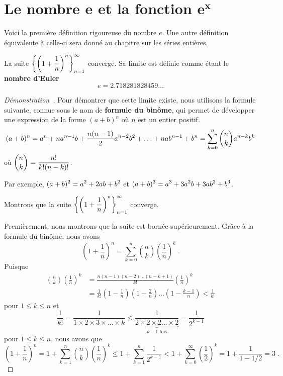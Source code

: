 {\section{Le nombre $\mathbf{e}$ et la fonction $\mathbf{e^x}$}\label{nbrE}


Voici la première définition rigoureuse du nombre $e$.  Une autre
définition équivalente à celle-ci sera donné au chapitre sur les
séries entières.

\begin{theorem}
La suite
$\displaystyle \left\{\left(1+\frac{1}{n}\right)^n\right\}_{n=1}^\infty$ 
converge.  Sa limite est définie comme étant le {\bfseries nombre
d'Euler}
\[
e=2.718281828459\ldots
\]
\label{limitDefe}
\end{theorem}

\begin{proof}[Démonstration\ \theory]
Pour démontrer que cette limite existe, nous utilisons la formule
suivante, connue sous le nom de
{\bfseries formule du binôme}, 
qui permet de développer une expression de la forme $(a+b)^n$ où $n$
est un entier positif.
\[
(a+b)^n = a^n + n a^{n-1}b + \frac{n(n-1)}{2}a^{n-2}b^2 + \ldots
+ n a b^{n-1} + b^n \\
= \sum_{k=0}^n \binom{n}{k} a^{n-k} b^k
\]
où $\displaystyle \binom{n}{k} = \frac{n!}{k!(n-k)!}$.

Par exemple, $\displaystyle (a+b)^2 = a^2 + 2ab + b^2$
et $\displaystyle (a+b)^3 = a^3 + 3a^2b + 3ab^2 + b^3$.

Montrons que la suite
$\displaystyle \left\{\left(1+\frac{1}{n}\right)^n\right\}_{n=1}^\infty$ 
converge.

Premièrement, nous montrons que la suite est bornée supérieurement.  Grâce
à la formule du binôme, nous avons
\[
\left( 1 + \frac{1}{n} \right)^n = \sum_{k=0}^n \binom{n}{k}
\left(\frac{1}{n}\right)^k \; .
\]
Puisque
\begin{align*}
\binom{n}{k} \left(\frac{1}{n}\right)^k
&= \frac{n(n-1)(n-2)\ldots(n-k+1)}{k!}\left(\frac{1}{n}\right)^k \\
&= \frac{1}{k!}\left(1-\frac{1}{n}\right)\left(1 - \frac{2}{n}\right)\ldots
\left(1-\frac{k-1}{n}\right)
< \frac{1}{k!}
\end{align*}
pour $1\leq k \leq n$ et
\[
\frac{1}{k!} = \frac{1}{1\times 2\times 3\times \ldots\times k} \leq
\frac{1}{\underbrace{2\times 2 \times 2 \ldots \times 2}_{k-1\text{ fois}}}
 = \frac{1}{2^{k-1}}
\]
pour $1\leq k \leq n$, nous avons que
\[
\left( 1 + \frac{1}{n} \right)^n 
= 1 + \sum_{k=1}^n \binom{n}{k} \left(\frac{1}{n}\right)^k
\leq 1 + \sum_{k=1}^n \frac{1}{2^{k-1}}
< 1 + \sum_{k=0}^\infty \left(\frac{1}{2}\right)^k
= 1 + \frac{1}{1-1/2} = 3 \; .
\]


\end{proof}}
